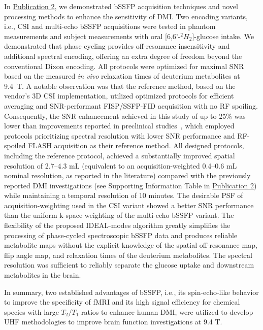 In \hyperref[sec:paper2]{Publication 2}, we demonstrated \gls{bSSFP} acquisition techniques and novel processing methods to enhance the sensitivity of \gls{DMI}. Two encoding variants, i.e., \gls{CSI} and multi-echo \gls{bSSFP} acquisitions were tested in phantom measurements and subject measurements with oral [6,6'-$^2H_2$]-glucose intake. We demonstrated that phase cycling provides off-resonance insensitivity and additional spectral encoding, offering an extra degree of freedom beyond the conventional Dixon encoding.  All protocols were optimized for maximal SNR based on the measured \textit{in vivo} relaxation times of deuterium metabolites at 9.4~T. A notable observation was that the reference method, based on the vendor's 3D \gls{CSI} implementation, utilized optimized protocols for efficient averaging and SNR-performant \gls{FISP}/\gls{SSFP}-\gls{FID} acquisition with no RF spoiling. Consequently, the SNR enhancement achieved in this study of up to 25\% was lower than improvements reported in preclinical studies~\cite{petersImprovingDeuteriumMetabolic2021,montraziHighsensitivityDeuteriumMetabolic2023}, which employed protocols prioritizing spectral resolution with lower \gls{SNR} performance and RF-spoiled FLASH acquisition as their reference method. All designed protocols, including the reference protocol, achieved a substantially improved spatial resolution of 2.7–4.3 mL (equivalent to an acquisition-weighted 0.4–0.6 mL nominal resolution, as reported in the literature) compared with the previously reported \gls{DMI} investigations (see Supporting Information Table in \hyperref[sec:paper2]{Publication 2}) while maintaining a temporal resolution of 10 minutes. The desirable \gls{PSF} of acquisition-weighting used in the \gls{CSI} variant showed a better \gls{SNR} performance than the uniform k-space weighting of the multi-echo \gls{bSSFP} variant. The flexibility of the proposed IDEAL-modes algorithm greatly simplifies the processing of phase-cycled spectroscopic bSSFP data and produces reliable metabolite maps without the explicit knowledge of the spatial off-resonance map, flip angle map, and relaxation times of the deuterium metabolites. The spectral resolution was sufficient to reliably separate the glucose uptake and downstream metabolites in the brain.   

In summary, two established advantages of bSSFP, i.e., its spin-echo-like behavior to improve the specificity of fMRI and its high signal efficiency for chemical species with large $T_2/T_1$ ratios to enhance human DMI, were utilized to develop \gls{UHF} methodologies to improve  brain function investigations at 9.4 T.

